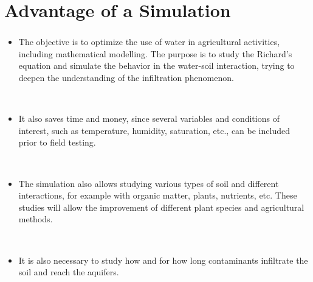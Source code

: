 \section{Advantage of a Simulation}
\begin{frame}
	\frametitle{\secname}
	\begin{itemize}
		\item The objective is to \alert{optimize the use of water} in
		      agricultural activities, including mathematical modelling.
		      The purpose is to study the \alert{Richard's equation} and
		      simulate the behavior in the water-soil interaction, trying
		      to deepen the understanding of the
		      \alert{infiltration phenomenon}.

		      \

		\item It also saves \alert{time} and \alert{money}, since several
		      variables and conditions of interest, such as temperature,
		      humidity, saturation, etc., can be included prior to field
		      testing.

		      \

		\item The simulation also allows studying various types of
		      soil and different interactions, for example with
		      \alert{organic matter}, \alert{plants}, \alert{nutrients}, etc.
		      These studies will allow the improvement of different plant
		      species and agricultural methods.

		      \

		\item It is also necessary to study how and for how long
		      contaminants infiltrate the soil and reach the aquifers.
	\end{itemize}
\end{frame}

